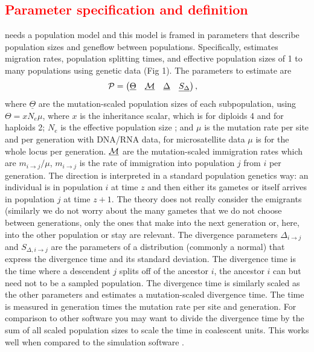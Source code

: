 \subsection{\textcolor{red}{Parameter specification and definition}} 
\migrate needs a population model and this model is framed in parameters that describe population sizes and geneflow between populations.
Specifically, \migrate estimates migration rates, population splitting times, and effective population sizes of 1 to many populations
using genetic data (Fig 1).  The parameters to estimate are
\begin{align}
\label{PARAMETERS}
\mathcal{P} &= \left(\begin{matrix}  \underline{\Theta} & \underline{\mathcal{M}} & \underline{\Delta} & \underline{S_\Delta}\end{matrix}\right),
\end{align}
where $ \underline{\Theta}$ are the mutation-scaled population sizes of each subpopulation, using $\Theta=xN_e\mu$, where $x$ is the inheritance scalar, which is for diploids 4 and for haploids 2; $N_e$ is the effective population size ; and $\mu$ is the mutation rate per site and per generation with DNA/RNA data, for microsatellite data $\mu$ is for the whole locus per generation. $ \underline{\mathcal{M}}$ are the mutation-scaled immigration rates which are $m_{i\rightarrow j} / \mu$, $m_{i\rightarrow j}$ is the rate of immigration into population $j$ from $i$ per generation. The direction is interpreted in a standard population genetics way: an individual is in population $i$ at time $z$ and then either its gametes or itself arrives in population $j$ at time $z+1$. The theory does not really consider the emigrants (similarly we do not worry about the many gametes that we do not choose between generations, only the ones that make into the next generation or, here, into the other population or stay are relevant. The divergence parameters $\Delta_{i\rightarrow j}$ and $S_{\Delta, i\rightarrow j}$ are the parameters of a distribution (commonly a normal) that express the divergence time and its standard deviation. The divergence time is the time where a descendent $j$ splits off of the ancestor $i$, the ancestor $i$ can but need not to be a sampled population. The divergence time is similarly scaled as the other parameters and \migrate estimates a mutation-scaled divergence time. The time is measured in generation times the mutation rate per site and generation. For comparison to other software you may want to divide the divergence time by the sum of all scaled population sizes to scale the time in coalescent units. This works well when compared to the simulation software \ms \citep{hudson2002}.
  
